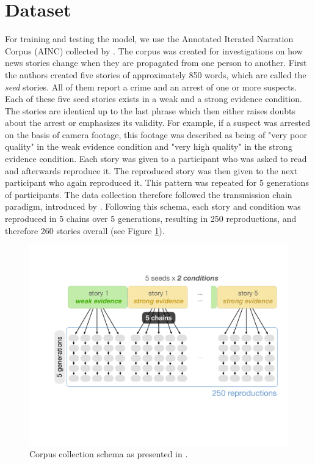 \documentclass[11pt,a4paper]{article}
\begin{document}
\section{Dataset}
For training and testing the model, we use the Annotated Iterated Narration Corpus (AINC) collected by \cite{Kreiss:2019}. The corpus was created for investigations on how news stories change when they are propagated from one person to another. First the authors created five stories of approximately 850 words, which are called the \textit{seed} stories. All of them report a crime and an arrest of one or more suspects. Each of these five seed stories exists in a weak and a strong evidence condition. The stories are identical up to the last phrase which then either raises doubts about the arrest or emphasizes its validity. For example, if a suspect was arrested on the basis of camera footage, this footage was described as being of "very poor quality" in the weak evidence condition and "very high quality" in the strong evidence condition. Each story was given to a participant who was asked to read and afterwards reproduce it. The reproduced story was then given to the next participant who again reproduced it. This pattern was repeated for 5 generations of participants. The data collection therefore followed the transmission chain paradigm, introduced by \cite{Bartlett:1932}. Following this schema, each story and condition was reproduced in 5 chains over 5 generations, resulting in 250 reproductions, and therefore 260 stories overall (see Figure \ref{fig:corpus-overview}).

\begin{figure}[t!]
	\includegraphics[width=\linewidth]{graphs/corpus-overview.pdf}
	\caption{Corpus collection schema as presented in \cite{Kreiss:2019}.}
	\label{fig:corpus-overview}
\end{figure}
\end{document}

